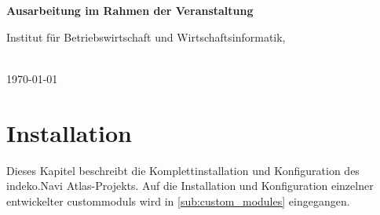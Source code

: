 \begin{titlepage}
\begin{figure}
\begin{minipage}{0.25\textwidth}
\begin{flushright}
        \end{flushright}
    \end{minipage}
    \vspace{4cm}
\end{figure}
\begin{center}

    \Huge{\textbf{\titel}}

    \Huge{\textbf{\untertitel}}
    \vspace{2cm}
\end{center}
\begin{center}
    \vspace*{0cm}
    \textbf{Ausarbeitung im Rahmen der Veranstaltung \veranstaltung}
    \vspace{1cm}
\end{center}
\begin{center}
    Institut für Betriebswirtschaft und Wirtschaftsinformatik,

    \arbeitsgruppe
\end{center}
\begin{center}
    \vspace{5cm}
    \autor\\


    \today
\end{center}
\end{titlepage}
\newpage


\tableofcontents

\newpage
\listoffigures
\thispagestyle{empty}

\glsaddall
\printglossary[type=\acronymtype,title = Abkürzungsverzeichnis]

\newpage
\restoregeometry
{}




\section{Installation}
Dieses Kapitel beschreibt die Komplettinstallation und Konfiguration des \acrshort{indeko}.Navi Atlas-Projekts. Auf die Installation und Konfiguration einzelner entwickelter \glspl{custommodul} wird in \cref{sub:custom_modules} eingegangen.


